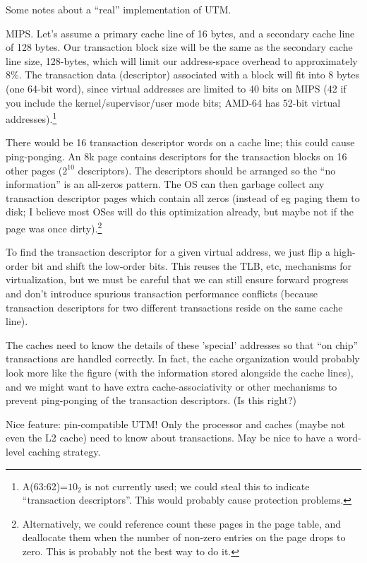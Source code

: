 Some notes about a ``real'' implementation of UTM.

MIPS.  Let's assume a primary cache line of 16 bytes, and a secondary
cache line of 128 bytes.  Our transaction block size will be the same
as the secondary cache line size, 128-bytes, which will limit our
address-space overhead to approximately 8\%.  The transaction data (descriptor)
associated with a block will fit into 8 bytes (one 64-bit word), since
virtual addresses are limited to 40 bits on MIPS (42 if you include
the kernel/supervisor/user mode bits; AMD-64 has 52-bit virtual
addresses).\footnote{A(63:62)=$10_2$ is not currently used; we could
steal this to indicate ``transaction descriptors''.  This would probably
cause protection problems.}

There would be 16 transaction descriptor words on a cache line; this
could cause ping-ponging.  An 8k page contains descriptors for the
transaction blocks on 16 other pages ($2^{10}$ descriptors).  The
descriptors should be arranged so the ``no information'' is an
all-zeros pattern.  The OS can then garbage collect any transaction
descriptor pages which contain all zeros (instead of eg paging them to
disk; I believe most OSes will do this optimization already, but maybe
not if the page was once dirty).\footnote{Alternatively, we could reference
count these pages in the page table, and deallocate them when the
number of non-zero entries on the page drops to zero.  This is
probably not the best way to do it.}

To find the transaction descriptor for a given virtual address, we
just flip a high-order bit and shift the low-order bits.  This reuses
the TLB, etc, mechanisms for virtualization, but we must be careful
that we can still ensure forward progress and don't introduce spurious
transaction performance conflicts (because transaction descriptors for
two different transactions reside on the same cache line).

The caches need to know the details of these 'special' addresses so
that ``on chip'' transactions are handled correctly.  In fact, the
cache organization would probably look more like the figure (with the
information stored alongside the cache lines), and we might want to
have extra cache-associativity or other mechanisms to prevent
ping-ponging of the transaction descriptors. (Is this right?)

Nice feature: pin-compatible UTM!  Only the processor and caches
(maybe not even the L2 cache) need to know about transactions.
May be nice to have a word-level caching strategy.

